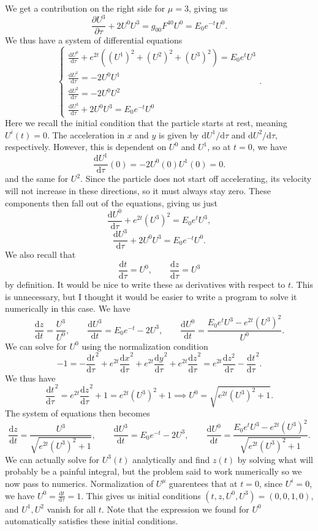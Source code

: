 \documentclass[11pt, letterpaper]{article}
\theoremstyle{plain}
\begin{document}
We get a contribution on the right side for $\mu =3$, giving us
\[
	\frac{\partial U^3}{\partial \tau } +2U^0U^3=g_{00} F^{40} U^0=E_0e^{-t} U^0
.\]
We thus have a system of differential equations
\[
	\begin{cases}
		\displaystyle{\frac{\mathrm{d}U^0}{\mathrm{d}\tau } +e^{2t} \left( \left( U^1 \right) ^2+\left( U^2 \right) ^2+\left( U^3 \right) ^2 \right) =E_0e^tU^3}\\[5pt]
		\displaystyle{\frac{\mathrm{d}U^1}{\mathrm{d}\tau } =-2U^0U^1}\\[5pt]
		\displaystyle{\frac{\mathrm{d}U^2}{\mathrm{d}\tau } =-2U^0U^2}\\[5pt]
		\displaystyle{\frac{\mathrm{d}U^3}{\mathrm{d}\tau }+2U^0U^3 =E_0e^{-t} U^0}
	\end{cases}
.\]
Here we recall the initial condition that the particle starts at rest, meaning $U^i (t)=0$. The acceleration in $x$ and $y$ is given by $\mathrm{d} U^1/\mathrm{d} \tau $ and $\mathrm{d} U^2/\mathrm{d} \tau $, respectively. However, this is dependent on $U^0$ and $U^1$, so at $t=0$, we have
\[
	\frac{\mathrm{d}U^1}{\mathrm{d}\tau } (0)=-2U^0(0)U^1(0)=0
.\]
and the same for $U^2$. Since the particle does not start off accelerating, its velocity will not increase in these directions, so it must always stay zero. These components then fall out of the equations, giving us just
\[
	\frac{\mathrm{d}U^0}{\mathrm{d}\tau } +e^{2t} \left( U^3 \right) ^2=E_0e^tU^3,
\]
\[
	\frac{\mathrm{d}U^3}{\mathrm{d}\tau } +2U^0U^3=E_0e^{-t} U^0
.\]
We also recall that
\[
	\frac{\mathrm{d}t}{\mathrm{d}\tau } =U^0,\qquad \frac{\mathrm{d}z}{\mathrm{d}\tau } =U^3
\]
by definition. It would be nice to write these as derivatives with respect to $t$. This is unnecessary, but I thought it would be easier to write a program to solve it numerically in this case. We have
\[
	\frac{\mathrm{d}z}{\mathrm{d}t} =\frac{U^3}{U^0} ,\qquad \frac{\mathrm{d}U^3}{\mathrm{d}t} =E_0e^{-t} -2U^3,\qquad \frac{\mathrm{d}U^0}{\mathrm{d}t} =\frac{E_0e^tU^3 -e^{2t} (U^3)^2}{U^0}
.\]
We can solve for $U^0$ using the normalization condition
\[
	-1=-\frac{\mathrm{d}t}{\mathrm{d}\tau } ^2+e^{2t} \frac{\mathrm{d}x}{\mathrm{d}\tau } ^2+e^{2t} \frac{\mathrm{d}y}{\mathrm{d}\tau } ^2+e^{2t} \frac{\mathrm{d}z}{\mathrm{d}\tau } ^2=e^{2t} \frac{\mathrm{d}z^2}{\mathrm{d}\tau }-\frac{\mathrm{d}t}{\mathrm{d}\tau } ^2
.\]
We thus have
\[
	\frac{\mathrm{d}t}{\mathrm{d}\tau } ^2=e^{2t} \frac{\mathrm{d}z}{\mathrm{d}\tau } ^2+1=e^{2t} (U^3)^2+1 \implies U^0=\sqrt{e^{2t} (U^3)^2+1} 
.\]
The system of equations then becomes
\[
	\frac{\mathrm{d}z}{\mathrm{d}t} =\frac{U^3}{\sqrt{e^{2t} (U^3)^2+1} } ,\qquad \frac{\mathrm{d}U^3}{\mathrm{d}t} =E_0e^{-t} -2U^3,\qquad \frac{\mathrm{d}U^0}{\mathrm{d}t} =\frac{E_0e^tU^3-e^{2t} (U^3)^2}{\sqrt{e^{2t} (U^3)^2+1} } 
.\]
We can actually solve for $U^3(t)$ analytically and find $z(t)$ by solving what will probably be a painful integral, but the problem said to work numerically so we now pass to numerics. Normalization of $U^\mu $ guarentees that at $t=0$, since $U^i=0$, we have $U^0=\frac{\mathrm{d}t}{\mathrm{d}\tau } =1$. This gives us initial conditions $(t,z,U^0,U^3)=(0,0,1,0)$, and $U^1,U^2$ vanish for all $t$. Note that the expression we found for $U^0$ automatically satisfies these initial conditions.
\end{document}
